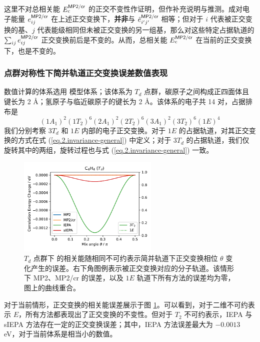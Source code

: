 这里不对总相关能 $E_\mathrm{c}^{\textsf{MP2/cr}}$ 的正交不变性作证明，但作补充说明与推测。成对电子能量 $e_{ij}^{\textsf{MP2/cr}}$ 在上述正交变换下，\textbf{并非}与 $\tilde{e}_{i'j'}^{\textsf{MP2/cr}}$ 相等；但对于 $i$ 代表被正交变换的基、$j$ 代表能级相同但未被正交变换的另一组基，那么对这些特定占据轨道的 $\sum_{ij} e_{ij}^{\textsf{MP2/cr}}$ 正交变换前后是不变的。从而，总相关能 $E_\mathrm{c}^{\textsf{MP2/cr}}$ 在当前的正交变换下，也是不变的。

\subsubsection{点群对称性下简并轨道正交变换误差数值表现}

数值计算的体系选用  模型体系；该体系为 $T_d$ 点群，碳原子之间构成正四面体且键长为 2 \AA；氢原子与临近碳原子的键长为 2 \AA。该体系的电子共 14 对，占据排布是
$$
(1 A_1)^2 (1 T_2)^6 (2 A_1)^2 (2 T_2)^6 (3 A_1)^2 (3 T_2)^6 (1 E)^4
$$
我们分别考察 $3 T_d$ 和 $1 E$ 内部的电子正交变换。对于 $1E$ 的占据轨道，对其正交变换的方式在式 (\ref{eq.2.invariance-general}) 中定义；对于 $3 T_d$ 的占据轨道，我们仅旋转其中的两组，旋转过程也与式 (\ref{eq.2.invariance-general}) 一致。

\begin{figure}[!ht]
  \centering
  \includegraphics[width=0.6\textwidth]{assets/invar-sep-C4H4-1.pdf}
  \caption{$T_d$ 点群下  的相关能随相同不可约表示简并轨道下正交变换相位 $\theta$ 变化产生的误差。右下角图例表示被正交变换对应的分子轨道。该情形下 MP2、MP2/cr 的误差，以及 $1E$ 轨道下所有方法的误差均为零，图上的曲线重合。}
  \label{fig.2.invar-sep-C4H4-1}
\end{figure}

对于当前情形，正交变换的相关能误差展示于图 \ref{fig.2.invar-sep-C4H4-1}。可以看到，对于二维不可约表示 $E$，所有方法都表现出了正交变换的不变性。但对于 $T_2$ 不可约表示，IEPA 与 sIEPA 方法存在一定的正交变换误差；其中，IEPA 方法误差最大为 $-0.0013$ eV，对于当前体系是相当小的数值。

